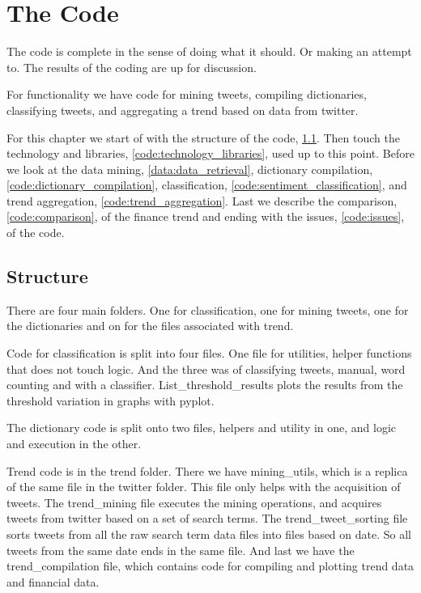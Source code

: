 \chapter{The Code}
The code is complete in the sense of doing what it should. Or making an attempt
to. The results of the coding are up for discussion.

For functionality we have code for mining tweets, compiling dictionaries,
classifying tweets, and aggregating a trend based on data from twitter.  

For this chapter we start of with the structure of the code,
\ref{code:structure}. Then touch the technology and libraries,
\ref{code:technology_libraries}, used up to this point. Before we look at the
data mining, \ref{data:data_retrieval}, dictionary compilation,
\ref{code:dictionary_compilation}, classification,
\ref{code:sentiment_classification}, and trend aggregation,
\ref{code:trend_aggregation}. Last we describe the comparison,
\ref{code:comparison}, of the finance trend and ending with the issues,
\ref{code:issues}, of the code.  

\section{Structure}\label{code:structure}
There are four main folders. One for classification, one for mining tweets, one
for the dictionaries and on for the files associated with trend. 

Code for classification is split into four files. One file for utilities,
helper functions that does not touch logic. And the three was of classifying
tweets, manual, word counting and with a classifier. List\_threshold\_results
plots the results from the threshold variation in graphs with pyplot. 

The dictionary code is split onto two files, helpers and utility in one, and
logic and execution in the other. 

Trend code is in the trend folder. There we have mining\_utils, which is a
replica of the same file in the twitter folder. This file only helps with the
acquisition of tweets. The trend\_mining file executes the mining operations,
and acquires tweets from twitter based on a set of search terms. The
trend\_tweet\_sorting file sorts tweets from all the raw search term data files
into files based on date. So all tweets from the same date ends in the same
file. And last we have the trend\_compilation file, which contains code for
compiling and plotting trend data and financial data.  

